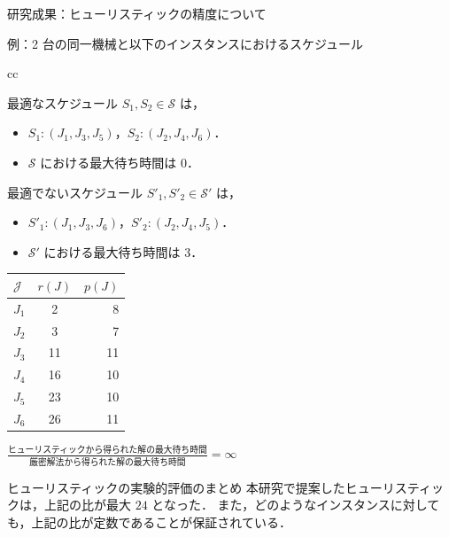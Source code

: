 \documentclass[dvipdfmx]{beamer}
\begin{document}
    \begin{frame}{研究成果：ヒューリスティックの精度について}
      \begin{exampleblock}{例：2 台の同一機械と以下のインスタンスにおけるスケジュール}
        \begin{tabular}{cc}
          \begin{minipage}[]{0.6\hsize}
            最適なスケジュール $S_1, S_2 \in \mathcal{S}$ は，
            \begin{itemize}
              \item $S_1:(J_1,J_3,J_5)$，$S_2:(J_2,J_4,J_6)$．
              \item $\mathcal{S}$ における最大待ち時間は $0$．
            \end{itemize}
            最適でないスケジュール $S'_1, S'_2 \in \mathcal{S'}$ は，
            \begin{itemize}
              \item $S'_1:(J_1,J_3,J_6)$，$S'_2:(J_2,J_4,J_5)$．
              \item $\mathcal{S'}$ における最大待ち時間は $3$．
            \end{itemize}
          \end{minipage}
          \begin{minipage}[c]{0.4\hsize}
            \begin{table}[htb]
              \begin{tabular}{|l|c|r|} \hline
                $\mathcal{J}$ & $r(J)$ & $p(J)$ \\ \hline \hline
                $J_1$ & 2 & 8 \\ \hline
                $J_2$ & 3 & 7 \\ \hline
                $J_3$ & 11 & 11 \\ \hline
                $J_4$ & 16 & 10 \\ \hline
                $J_5$ & 23 & 10 \\ \hline
                $J_6$ & 26 & 11 \\ \hline
              \end{tabular}
            \end{table}
          \end{minipage}
        \end{tabular}
        ${\displaystyle \frac{\text{ヒューリスティックから得られた解の最大待ち時間}}{\text{厳密解法から得られた解の最大待ち時間}} = \infty}$
      \end{exampleblock}
      \begin{alertblock}{ヒューリスティックの実験的評価のまとめ}
        本研究で提案したヒューリスティックは，上記の比が最大 $24$ となった．
        また，どのようなインスタンスに対しても，上記の比が定数であることが保証されている．
      \end{alertblock}
    \end{frame}
\end{document}
